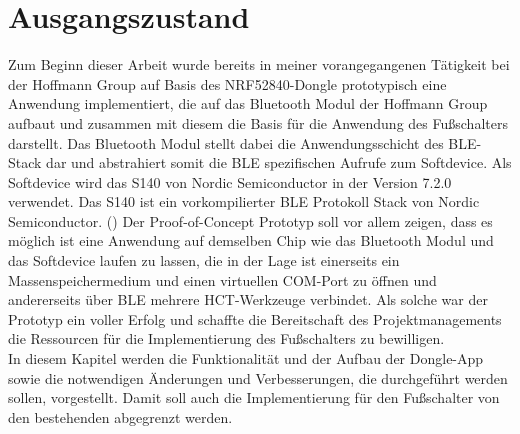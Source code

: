 \section{Ausgangszustand}
\label{Ausgangszustand}
Zum Beginn dieser Arbeit wurde bereits in meiner vorangegangenen Tätigkeit bei der Hoffmann Group auf Basis des NRF52840-Dongle prototypisch eine Anwendung implementiert, die auf das Bluetooth Modul der Hoffmann Group aufbaut und zusammen mit diesem die Basis für die Anwendung des Fußschalters darstellt. Das Bluetooth Modul stellt dabei die Anwendungsschicht des \ac{BLE}-Stack dar und abstrahiert somit die \ac{BLE} spezifischen Aufrufe zum Softdevice. Als Softdevice wird das S140 von Nordic Semiconductor in der Version 7.2.0 verwendet. Das S140 ist ein vorkompilierter BLE Protokoll Stack von Nordic Semiconductor. (\cite{NRF_Softdevice}) Der Proof-of-Concept Prototyp soll vor allem zeigen, dass es möglich ist eine Anwendung auf demselben Chip wie das Bluetooth Modul und das Softdevice laufen zu lassen, die in der Lage ist einerseits ein Massenspeichermedium und einen virtuellen COM-Port zu öffnen und andererseits über \ac{BLE} mehrere \ac{HCT}-Werkzeuge verbindet. Als solche war der Prototyp ein voller Erfolg und schaffte die Bereitschaft des Projektmanagements die Ressourcen für die Implementierung des Fußschalters zu bewilligen.\\
In diesem Kapitel werden die Funktionalität und der Aufbau der Dongle-App sowie die notwendigen Änderungen und Verbesserungen, die durchgeführt werden sollen, vorgestellt. Damit soll auch die Implementierung für den Fußschalter von den bestehenden abgegrenzt werden.

